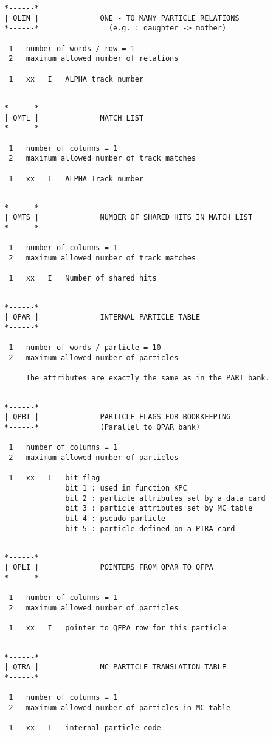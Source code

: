 \begin{verbatim}
*------*
| QLIN |              ONE - TO MANY PARTICLE RELATIONS
*------*                (e.g. : daughter -> mother)
 
 1   number of words / row = 1
 2   maximum allowed number of relations
 
 1   xx   I   ALPHA track number
 
\end{verbatim}
\begin{verbatim}
*------*
| QMTL |              MATCH LIST
*------*
 
 1   number of columns = 1
 2   maximum allowed number of track matches
 
 1   xx   I   ALPHA Track number
 
\end{verbatim}
\begin{verbatim}
*------*
| QMTS |              NUMBER OF SHARED HITS IN MATCH LIST
*------*
 
 1   number of columns = 1
 2   maximum allowed number of track matches
 
 1   xx   I   Number of shared hits
 
\end{verbatim}
\begin{verbatim}
*------*
| QPAR |              INTERNAL PARTICLE TABLE
*------*
 
 1   number of words / particle = 10
 2   maximum allowed number of particles
 
     The attributes are exactly the same as in the PART bank.
 
\end{verbatim}
\begin{verbatim}
*------*
| QPBT |              PARTICLE FLAGS FOR BOOKKEEPING
*------*              (Parallel to QPAR bank)
 
 1   number of columns = 1
 2   maximum allowed number of particles
 
 1   xx   I   bit flag
              bit 1 : used in function KPC
              bit 2 : particle attributes set by a data card
              bit 3 : particle attributes set by MC table
              bit 4 : pseudo-particle
              bit 5 : particle defined on a PTRA card
 
\end{verbatim}
\begin{verbatim}
*------*
| QPLI |              POINTERS FROM QPAR TO QFPA
*------*
 
 1   number of columns = 1
 2   maximum allowed number of particles
 
 1   xx   I   pointer to QFPA row for this particle
 
\end{verbatim}
\begin{verbatim}
*------*
| QTRA |              MC PARTICLE TRANSLATION TABLE
*------*
 
 1   number of columns = 1
 2   maximum allowed number of particles in MC table
 
 1   xx   I   internal particle code
\end{verbatim}
